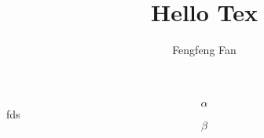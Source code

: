 \documentclass[12pt,a4paper]{article}
\title{Hello Tex}
\author{Fengfeng Fan}
\begin{document}
	\maketitle
	\begin{equation}
		\alpha
	\end{equation}
	fds
	\begin{equation}
		\beta
	\end{equation}
\end{document}
